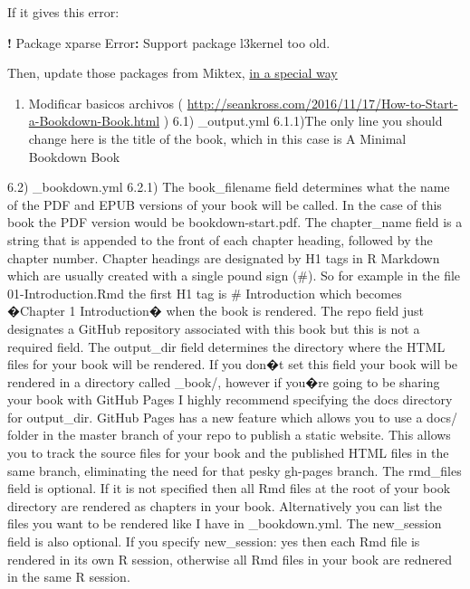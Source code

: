 \documentclass[]{book}
\newenvironment{Shaded}{\begin{snugshade}}{\end{snugshade}}
\newcommand{\StringTok}[1]{\textcolor[rgb]{0.31,0.60,0.02}{#1}}
\newcommand{\OperatorTok}[1]{\textcolor[rgb]{0.81,0.36,0.00}{\textbf{#1}}}
\newcommand{\NormalTok}[1]{#1}
\providecommand{\tightlist}{%
  \setlength{\itemsep}{0pt}\setlength{\parskip}{0pt}}
\theoremstyle{definition}
\theoremstyle{definition}
\theoremstyle{definition}
\theoremstyle{remark}
\begin{document}
If it gives this error:

\begin{Shaded}
\begin{Highlighting}[]
\OperatorTok{!}\StringTok{ }\NormalTok{Package xparse Error}\OperatorTok{:}\StringTok{ }\NormalTok{Support package l3kernel too old.}
\end{Highlighting}
\end{Shaded}

Then, update those packages from Miktex,
\href{https://tex.stackexchange.com/questions/132243/media9-l3kernel-too-old-support-outdated}{in
a special way}

\begin{enumerate}
\def\labelenumi{\arabic{enumi})}
\setcounter{enumi}{5}
\tightlist
\item
  Modificar basicos archivos (
  \url{http://seankross.com/2016/11/17/How-to-Start-a-Bookdown-Book.html}
  ) 6.1) \_output.yml 6.1.1)The only line you should change here is the
  title of the book, which in this case is A Minimal Bookdown Book
\end{enumerate}

6.2) \_bookdown.yml 6.2.1) The book\_filename field determines what the
name of the PDF and EPUB versions of your book will be called. In the
case of this book the PDF version would be bookdown-start.pdf. The
chapter\_name field is a string that is appended to the front of each
chapter heading, followed by the chapter number. Chapter headings are
designated by H1 tags in R Markdown which are usually created with a
single pound sign (\#). So for example in the file 01-Introduction.Rmd
the first H1 tag is \# Introduction which becomes �Chapter 1
Introduction� when the book is rendered. The repo field just designates
a GitHub repository associated with this book but this is not a required
field. The output\_dir field determines the directory where the HTML
files for your book will be rendered. If you don�t set this field your
book will be rendered in a directory called \_book/, however if you�re
going to be sharing your book with GitHub Pages I highly recommend
specifying the docs directory for output\_dir. GitHub Pages has a new
feature which allows you to use a docs/ folder in the master branch of
your repo to publish a static website. This allows you to track the
source files for your book and the published HTML files in the same
branch, eliminating the need for that pesky gh-pages branch. The
rmd\_files field is optional. If it is not specified then all Rmd files
at the root of your book directory are rendered as chapters in your
book. Alternatively you can list the files you want to be rendered like
I have in \_bookdown.yml. The new\_session field is also optional. If
you specify new\_session: yes then each Rmd file is rendered in its own
R session, otherwise all Rmd files in your book are rednered in the same
R session.
\end{document}
